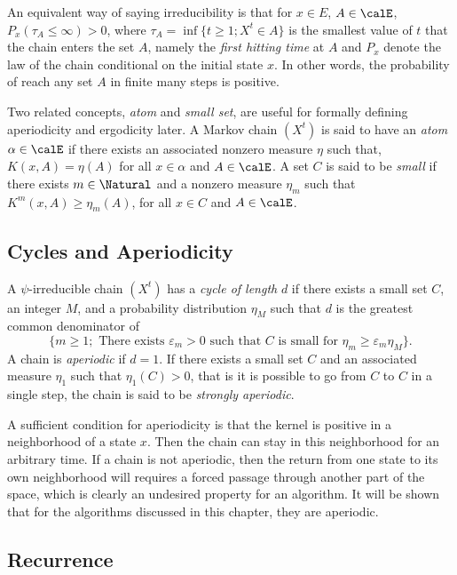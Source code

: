 An equivalent way of saying irreducibility is that for $x\in E$, $A\in\calE$,
$P_x(\tau_A\le\infty) > 0$, where $\tau_A = \inf\{t\ge1;X^t\in A\}$ is the
smallest value of $t$ that the chain enters the set $A$, namely the
\emph{first hitting time} at $A$ and $P_x$ denote the law of the chain
conditional on the initial state $x$. In other words, the probability of
reach any set $A$ in finite many steps is positive.

Two related concepts, \emph{atom} and \emph{small set}, are useful for
formally defining aperiodicity and ergodicity later. A Markov chain $(X^t)$
is said to have an \emph{atom} $\alpha\in\calE$ if there exists an associated
nonzero measure $\eta$ such that, $K(x,A) = \eta(A)$ for all $x\in\alpha$ and
$A\in\calE$. A set $C$ is said to be \emph{small} if there exists
$m\in\Natural$ and a nonzero measure $\eta_m$ such that
$K^m(x,A)\ge\eta_m(A)$, for all $x\in C$ and $A\in\calE$.

\subsection{Cycles and Aperiodicity}
\label{sub: Appdendix Cycles and Aperiodicity}

A $\psi$-irreducible chain $(X^t)$ has a \emph{cycle of length} $d$ if there
exists a small set $C$, an integer $M$, and a probability distribution
$\eta_M$ such that $d$ is the greatest common denominator of
\begin{equation*}
  \{m\ge1;\text{ There exists }\varepsilon_m > 0\text{ such that }C\text{ is
    small for }\eta_m\ge\varepsilon_m\eta_M\}.
\end{equation*}
A chain is \emph{aperiodic} if $d = 1$. If there exists a small set $C$ and
an associated measure $\eta_1$ such that $\eta_1(C) > 0$, that is it is
possible to go from $C$ to $C$ in a single step, the chain is said to be
\emph{strongly aperiodic}.

A sufficient condition for aperiodicity is that the kernel is positive in a
neighborhood of a state $x$. Then the chain can stay in this neighborhood for
an arbitrary time. If a chain is not aperiodic, then the return from one
state to its own neighborhood will requires a forced passage through another
part of the space, which is clearly an undesired property for an \mcmc
algorithm. It will be shown that for the algorithms discussed in this
chapter, they are aperiodic.

\subsection{Recurrence}
\label{sub: Appdendix Recurrence}

